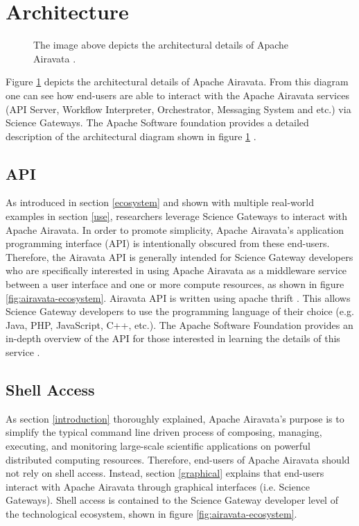 \documentclass[9pt,twocolumn,twoside]{styles/osajnl}
\begin{document}
\section{Architecture} \label{architecture}
\begin{figure}[htbp]
\centering
{}
\caption{The image above depicts the architectural details of Apache
  Airavata \cite{www-documentation}.}
\label{fig:airavata-architecture}
\end{figure}
Figure \ref{fig:airavata-architecture} depicts the architectural
details of Apache Airavata. From this diagram one can see how
end-users are able to interact with the Apache Airavata services (API
Server, Workflow Interpreter, Orchestrator, Messaging System and etc.)
via Science Gateways. The Apache Software foundation provides a
detailed description of the architectural diagram shown in figure
\ref{fig:airavata-architecture} \cite{www-documentation}.

\subsection{API} \label{api}
As introduced in section \ref{ecosystem} and shown with multiple
real-world examples in section \ref{use}, researchers leverage Science
Gateways to interact with Apache Airavata. In order to promote
simplicity, Apache Airavata's application programming interface (API)
is intentionally obscured from these end-users. Therefore, the
Airavata API is generally intended for Science Gateway developers who
are specifically interested in using Apache Airavata as a middleware
service between a user interface and one or more compute resources, as
shown in figure \ref{fig:airavata-ecosystem}. Airavata API is written
using apache thrift \cite{www-documentation}. This allows Science
Gateway developers to use the programming language of their choice
(e.g. Java, PHP, JavaScript, C++, etc.). The Apache Software Foundation
provides an in-depth overview of the API for those interested in
learning the details of this service \cite{www-api}.

\subsection{Shell Access} \label{shell}
As section \ref{introduction} thoroughly explained, Apache Airavata's
purpose is to simplify the typical command line driven process of
composing, managing, executing, and monitoring large-scale scientific
applications on powerful distributed computing resources. Therefore,
end-users of Apache Airavata should not rely on shell access. Instead,
section \ref{graphical} explains that end-users interact with Apache
Airavata through graphical interfaces (i.e. Science Gateways). Shell
access is contained to the Science Gateway developer level of the
technological ecosystem, shown in figure \ref{fig:airavata-ecosystem}.
\end{document}
